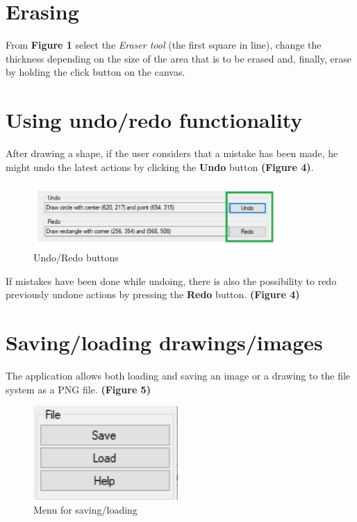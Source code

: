 \documentclass[12pt]{article}
\begin{document}
\section*{Erasing}

From \textbf{Figure 1} select the \textit{Eraser tool} (the first square in line), change the thickness depending on the size of the area that is to be erased and, finally, erase by holding the click button on the canvas.

\section*{Using undo/redo functionality}

After drawing a shape, if the user considers that a mistake has been made, he might undo the latest actions by clicking the \textbf{Undo} button \textbf{(Figure 4)}.

\begin{figure}[h]
\centering
\includegraphics[width=9.5cm]{graphics/undo_redo.png}
\caption{Undo/Redo buttons}
\end{figure}

If mistakes have been done while undoing, there is also the possibility to redo previously undone actions by pressing the \textbf{Redo} button. \textbf{(Figure 4)}


\section*{Saving/loading drawings/images}

The application allows both loading and saving an image or a drawing to the file system as a PNG file. \textbf{(Figure 5)}

\begin{figure}[h]
\centering
\includegraphics[width=5.5cm]{graphics/save_load_help.png}
\caption{Menu for saving/loading}
\end{figure}
\end{document}
